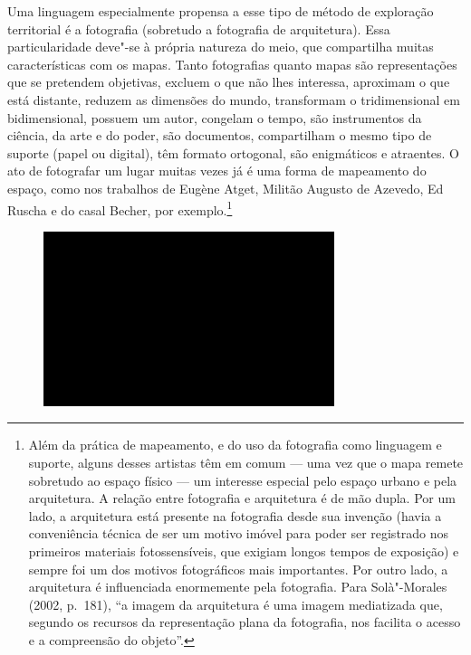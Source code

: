 Uma linguagem especialmente propensa a esse tipo de método de exploração
territorial é a fotografia (sobretudo a fotografia de arquitetura). Essa
particularidade deve"-se à própria natureza do meio, que compartilha
muitas características com os mapas. Tanto fotografias quanto mapas são
representações que se pretendem objetivas, excluem o que não lhes
interessa, aproximam o que está distante, reduzem as dimensões do mundo,
transformam o tridimensional em bidimensional, possuem um autor,
congelam o tempo, são instrumentos da ciência, da arte e do poder, são
documentos, compartilham o mesmo tipo de suporte (papel ou digital), têm
formato ortogonal, são enigmáticos e atraentes. O ato de fotografar um
lugar muitas vezes já é uma forma de mapeamento do espaço, como nos
trabalhos de Eugène Atget, Militão Augusto de Azevedo, Ed Ruscha e do
casal Becher, por exemplo.\footnote{Além da prática de mapeamento, e do
  uso da fotografia como linguagem e suporte, alguns desses artistas têm
  em comum --- uma vez que o mapa remete sobretudo ao espaço físico --- um
  interesse especial pelo espaço urbano e pela arquitetura. A relação
  entre fotografia e arquitetura é de mão dupla. Por um lado, a
  arquitetura está presente na fotografia desde sua invenção (havia a
  conveniência técnica de ser um motivo imóvel para poder ser registrado
  nos primeiros materiais fotossensíveis, que exigiam longos tempos de
  exposição) e sempre foi um dos motivos fotográficos mais importantes.
  Por outro lado, a arquitetura é influenciada enormemente pela
  fotografia. Para Solà"-Morales (2002, p.~181), ``a imagem da
  arquitetura é uma imagem mediatizada que, segundo os recursos da
  representação plana da fotografia, nos facilita o acesso e a
  compreensão do objeto''.}

\begin{figure}[!ht]
\centering
 \includegraphics[width=85mm]{./imgs/im1.jpg}
\caption{\tiny{}}
\end{figure}

